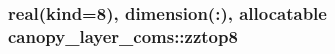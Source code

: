 \subsubsection[{\texorpdfstring{zztop8}{zztop8}}]{\setlength{\rightskip}{0pt plus 5cm}real(kind=8), dimension(\+:), allocatable canopy\+\_\+layer\+\_\+coms\+::zztop8}\hypertarget{namespacecanopy__layer__coms_a365c61dc2bce371b5384ff2bbc4c2a9d}{}\label{namespacecanopy__layer__coms_a365c61dc2bce371b5384ff2bbc4c2a9d}
